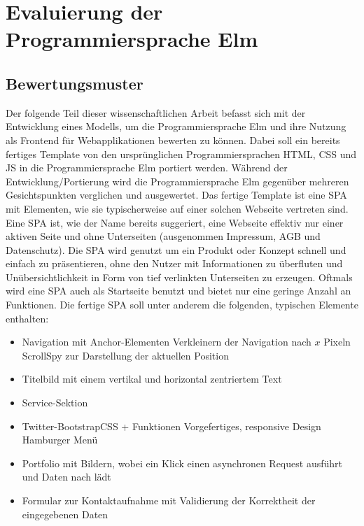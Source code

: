 \chapter{Evaluierung der Programmiersprache Elm}
\label{sec:Evaluierung der Programmiersprache Elm}
\pagestyle{plain}

\section{Bewertungsmuster}
\label{sec:Bewertungsmuster}
Der folgende Teil dieser wissenschaftlichen Arbeit befasst sich mit der Entwicklung eines Modells, um die Programmiersprache Elm und ihre Nutzung als Frontend für Webapplikationen bewerten zu können. Dabei soll ein bereits fertiges Template von den ursprünglichen Programmiersprachen \ac{HTML}, \ac{CSS} und \ac{JS} in die Programmiersprache Elm portiert werden. Während der Entwicklung/Portierung wird die Programmiersprache Elm gegenüber mehreren Gesichtspunkten verglichen und ausgewertet.
Das fertige Template ist eine \ac{SPA} mit Elementen, wie sie typischerweise auf einer solchen Webseite vertreten sind. Eine \ac{SPA} ist, wie der Name bereits suggeriert, eine Webseite effektiv nur einer aktiven Seite und ohne Unterseiten (ausgenommen Impressum, AGB und Datenschutz). Die \ac{SPA} wird genutzt um ein Produkt oder Konzept schnell und einfach zu präsentieren, ohne den Nutzer mit Informationen zu überfluten und Unübersichtlichkeit in Form von tief verlinkten Unterseiten zu erzeugen. Oftmals wird eine SPA auch als Startseite benutzt und bietet nur eine geringe Anzahl an Funktionen.
Die fertige \ac{SPA} soll unter anderem die folgenden, typischen Elemente enthalten:
\begin{itemize}
\item Navigation mit Anchor-Elementen
\subitem{-} Verkleinern der Navigation nach $x$ Pixeln
\subitem{-} ScrollSpy zur Darstellung der aktuellen Position
\item Titelbild mit einem vertikal und horizontal zentriertem Text
\item Service-Sektion
\item Twitter-Bootstrap\ac{CSS} + Funktionen
\subitem{-} Vorgefertiges, responsive Design
\subitem{-} Hamburger Menü
\item Portfolio mit Bildern, wobei ein Klick einen asynchronen Request ausführt und Daten nach lädt
\item Formular zur Kontaktaufnahme mit Validierung der Korrektheit der eingegebenen Daten
\end{itemize}
